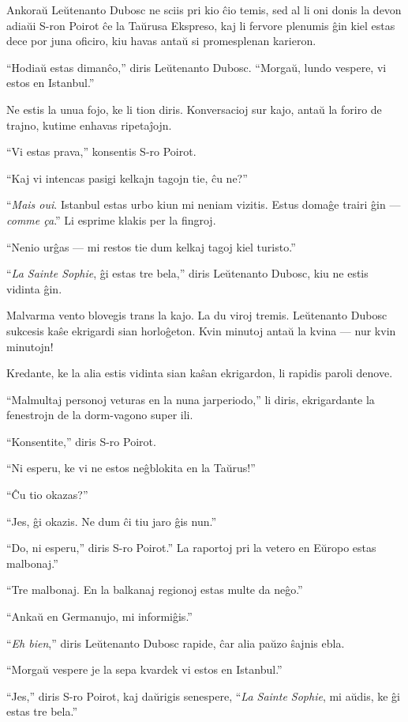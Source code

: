 Ankoraŭ Leŭtenanto Dubosc ne sciis pri kio ĉio temis, sed al li oni donis la devon adiaŭi S-ron Poirot ĉe la Taŭrusa Ekspreso, kaj li fervore plenumis ĝin kiel estas dece por juna oficiro, kiu havas antaŭ si promesplenan karieron.

``Hodiaŭ estas dimanĉo,'' diris Leŭtenanto Dubosc. ``Morgaŭ, lundo vespere, vi estos en Istanbul.''

Ne estis la unua fojo, ke li tion diris. Konversacioj sur kajo, antaŭ la foriro de trajno, kutime enhavas ripetaĵojn.

``Vi estas prava,'' konsentis S-ro Poirot.

``Kaj vi intencas pasigi kelkajn tagojn tie, ĉu ne?''

``\emph{Mais oui}. Istanbul estas urbo kiun mi neniam vizitis. Estus domaĝe trairi ĝin --- \emph{comme ça}.'' Li esprime klakis per la fingroj.

``Nenio urĝas --- mi restos tie dum kelkaj tagoj kiel turisto.''

``\emph{La Sainte Sophie}, ĝi estas tre bela,'' diris Leŭtenanto Dubosc, kiu ne estis vidinta ĝin.

Malvarma vento blovegis trans la kajo. La du viroj tremis. Leŭtenanto Dubosc sukcesis kaŝe ekrigardi sian horloĝeton. Kvin minutoj antaŭ la kvina --- nur kvin minutojn!

Kredante, ke la alia estis vidinta sian kaŝan ekrigardon, li rapidis paroli denove.

``Malmultaj personoj veturas en la nuna jarperiodo,'' li diris, ekrigardante la fenestrojn de la dorm-vagono super ili.

``Konsentite,'' diris S-ro Poirot.

``Ni esperu, ke vi ne estos neĝblokita en la Taŭrus!''

``Ĉu tio okazas?''

``Jes, ĝi okazis. Ne dum ĉi tiu jaro ĝis nun.''

``Do, ni esperu,'' diris S-ro Poirot.'' La raportoj pri la vetero en Eŭropo estas malbonaj.''

``Tre malbonaj. En la balkanaj regionoj estas multe da neĝo.''

``Ankaŭ en Germanujo, mi informiĝis.''

``\emph{Eh bien},'' diris Leŭtenanto Dubosc rapide, ĉar alia paŭzo ŝajnis ebla.

``Morgaŭ vespere je la sepa kvardek vi estos en Istanbul.''

``Jes,'' diris S-ro Poirot, kaj daŭrigis senespere, ``\emph{La Sainte Sophie}, mi aŭdis, ke ĝi estas tre bela.''

